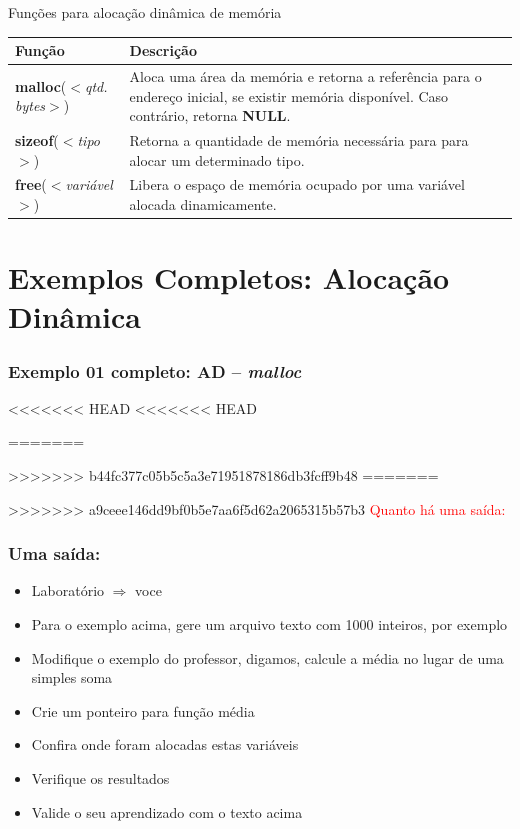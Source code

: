 \begin{frame}[fragile,c]{Funções para alocação dinâmica de memória}
  \begin{table}
   \centering
    \begin{tabular}{p{4cm}p{6cm}}
      \hline \textbf{Função} & \textbf{Descrição} \\
      \hline  \textbf{malloc}(\textit{$<$qtd. bytes$>$}) & Aloca uma área da memória e retorna a referência para o endereço inicial, se existir memória disponível. Caso contrário, retorna \textbf{NULL}.  \\
      \hline \textbf{sizeof}(\textit{$<$tipo$>$})  & Retorna a quantidade de memória necessária para para alocar um determinado tipo.\\
      \hline \textbf{free}(\textit{$<$variável$>$})  & Libera o espaço de memória ocupado por uma variável alocada dinamicamente.\\
      \hline
    \end{tabular}
  \end{table} 
\end{frame}

\section{Exemplos Completos: Alocação Dinâmica}

\begin{frame}[allowframebreaks=0.9, c]

\frametitle{Exemplo 01 completo: AD -- \textit{malloc}}

<<<<<<< HEAD
<<<<<<< HEAD

=======

>>>>>>> b44fc377c05b5c5a3e71951878186db3fcff9b48
=======

>>>>>>> a9ceee146dd9bf0b5e7aa6f5d62a2065315b57b3
\pause
\textcolor{red}{Quanto há uma saída:}
\end{frame}

\begin{frame}[fragile, c]

\frametitle{Uma saída:}
\begin{block}{}
\begin{itemize}
  \item Laboratório $\Rightarrow $ voce
  \item Para o exemplo acima, gere um arquivo texto com 1000 inteiros, por exemplo
  \item Modifique o exemplo do professor, digamos, calcule
  a média no lugar de uma simples soma
  \item Crie um ponteiro para  função média 
    \item Confira onde foram alocadas estas variáveis
  \item Verifique os resultados
  \item Valide o seu aprendizado com o texto acima 

\end{itemize}
\end{block}
\end{frame}


